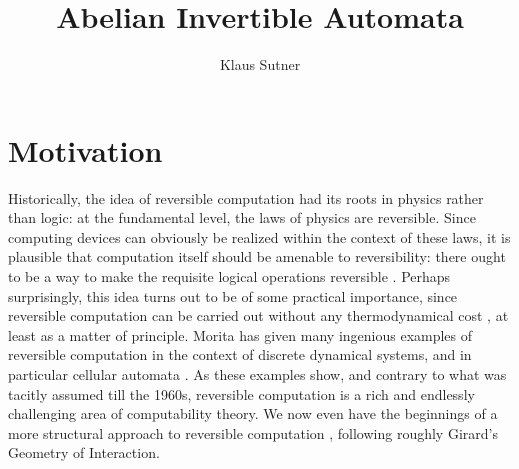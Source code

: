 \documentclass[12pt]{svmult}
\begin{document}
\title{Abelian Invertible Automata}
\author{Klaus Sutner}

\maketitle


\section{Motivation}
\label{sec:motivation}


Historically, the idea of reversible computation had its roots in physics rather than logic: 
at the fundamental level, the laws of physics are reversible.  
Since computing devices can obviously be realized within the context of these laws, 
it is plausible that computation itself should be amenable to reversibility: 
there ought to be a way to make the requisite logical operations reversible 
\cite{Bennett73,Lecerf63:machine_turing,Landauer96:physical_nature}.
Perhaps surprisingly, this idea turns out to be of some practical importance, since reversible computation 
can be carried out without any thermodynamical cost \cite{Bennett82}, at least as a 
matter of principle. 
Morita has given many ingenious examples of reversible computation in the context of 
discrete dynamical systems, and in particular cellular automata  
\cite{MoritaHarao89:univ_rever_ca,Morita92:univ_rever_oneway_ca,Morita94:rever_ca,Morita08:ecss}.
As these examples show, and contrary to what was tacitly assumed till the 1960s, reversible 
computation is a rich and endlessly challenging area of computability theory. 
We now even have the beginnings of a more structural approach 
to reversible computation \cite{Abramsky05:reversible}, 
following roughly Girard's Geometry of Interaction.
\end{document}
